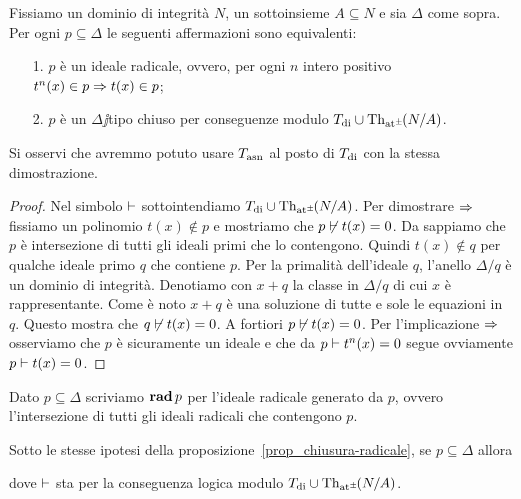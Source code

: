 \begin{proposition}\label{prop_chiusura-radicale}
Fissiamo un dominio di integrit\`a $N$, un sottoinsieme $A\subseteq N$ e sia $\Delta$ come sopra. Per ogni $p\subseteq\Delta$ le seguenti affermazioni sono equivalenti:
\begin{itemize}
\item[1.] $p$ \`e un ideale radicale, ovvero, per ogni $n$ intero positivo $t^n(x)\in p\Rightarrow t(x)\in p$;
\item[2.] $p$ \`e un $\Delta\jj$tipo chiuso per conseguenze modulo $T_{\rm di}\cup\textrm{Th}_{{\tiny\rm at^\pm}}\hskip-.3ex(N/A)$.
\end{itemize}
\end{proposition}
Si osservi che avremmo potuto usare $T_{\rm asn}$ al posto di $T_{\rm di}$ con la stessa dimostrazione.
\begin{proof}
Nel simbolo $\vdash$ sottointendiamo $T_{\rm di}\cup\textrm{Th}_{{\tiny\rm at^\pm}}\hskip-.3ex(N/A)$.  Per dimostrare $\Rightarrow$ fissiamo un polinomio $t(x)\notin p$ e mostriamo che $p\not\vdash t(x)=0$. Da  sappiamo che $p$ \`e intersezione di tutti gli ideali primi che lo contengono. Quindi $t(x)\notin q$ per qualche ideale primo $q$ che contiene $p$.  Per la primalit\`a dell'ideale $q$, l'anello $\Delta/q$ \`e un dominio di integrit\`a.  Denotiamo con $x+q$ la classe in $\Delta/q$ di cui $x$ \`e rappresentante. Come \`e noto $x+q$ \`e una soluzione di tutte e sole le equazioni in $q$. Questo mostra che $q\not\vdash t(x)=0$. A fortiori $p\not\vdash t(x)=0$. Per l'implicazione $\Rightarrow$ osserviamo che $p$ \`e sicuramente un ideale e che da $p\vdash t^n(x)=0$ segue ovviamente $p\vdash t(x)=0$. 
\end{proof}


Dato $p\subseteq\Delta$ scriviamo \emph{${\rm\bf rad}\,p$} per l'ideale radicale generato da $p$, ovvero l'intersezione di tutti gli ideali radicali che contengono $p$. 

\begin{corollary}\label{corol_caratterizzazione_rad}
Sotto le stesse ipotesi della proposizione~\ref{prop_chiusura-radicale}, se $p\subseteq\Delta$ allora


dove $\vdash$ sta per la conseguenza logica modulo $T_{\rm di}\cup\textrm{Th}_{{\tiny\rm at^\pm}}\hskip-.3ex(N/A)$.\QED
\end{corollary}


